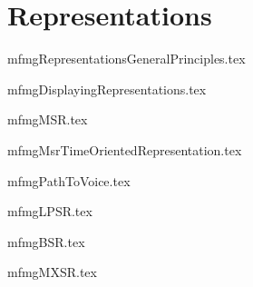 



\part{Representations}

{mfmgRepresentationsGeneralPrinciples.tex}

{mfmgDisplayingRepresentations.tex}

{mfmgMSR.tex}

{mfmgMsrTimeOrientedRepresentation.tex}

{mfmgPathToVoice.tex}

{mfmgLPSR.tex}

{mfmgBSR.tex}

{mfmgMXSR.tex}
